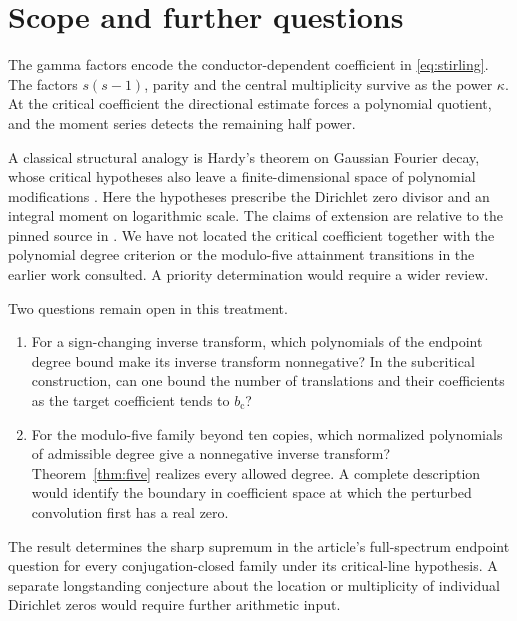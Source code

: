 \documentclass[11pt,letterpaper]{article}
\newcommand{\bcrit}{b_{\mathrm c}}
\begin{document}
\section{Scope and further questions}
The gamma factors encode the conductor-dependent coefficient in \eqref{eq:stirling}. The factors $s(s-1)$, parity and the central multiplicity survive as the power $\kappa$. At the critical coefficient the directional estimate forces a polynomial quotient, and the moment series detects the remaining half power.

A classical structural analogy is Hardy's theorem on Gaussian Fourier decay, whose critical hypotheses also leave a finite-dimensional space of polynomial modifications \cite{hardy}. Here the hypotheses prescribe the Dirichlet zero divisor and an integral moment on logarithmic scale. The claims of extension are relative to the pinned source in \cite{proveit}. We have not located the critical coefficient together with the polynomial degree criterion or the modulo-five attainment transitions in the earlier work consulted. A priority determination would require a wider review.

Two questions remain open in this treatment.
\begin{enumerate}
\item For a sign-changing inverse transform, which polynomials of the endpoint degree bound make its inverse transform nonnegative? In the subcritical construction, can one bound the number of translations and their coefficients as the target coefficient tends to $\bcrit$?
\item For the modulo-five family beyond ten copies, which normalized polynomials of admissible degree give a nonnegative inverse transform? Theorem~\ref{thm:five} realizes every allowed degree. A complete description would identify the boundary in coefficient space at which the perturbed convolution first has a real zero.
\end{enumerate}
The result determines the sharp supremum in the article's full-spectrum endpoint question for every conjugation-closed family under its critical-line hypothesis. A separate longstanding conjecture about the location or multiplicity of individual Dirichlet zeros would require further arithmetic input.
\end{document}
